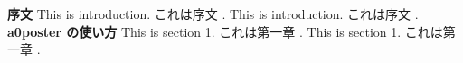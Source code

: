 \documentclass[landscape,a0b,final]{a0poster}
\begin{document}
\begin{poster}
\begin{multicols}{3} 

\noindent
{\bf \SkyBlue
序文
}
This is introduction.
これは序文
.
This is introduction.
これは序文
.
\bigbreak
\noindent
{\bf \DarkRed a0poster
の使い方
}
This is section 1.
これは第一章
.
This is section 1.
これは第一章
.
\bigbreak
\end{multicols}
\end{poster}
\end{document}
